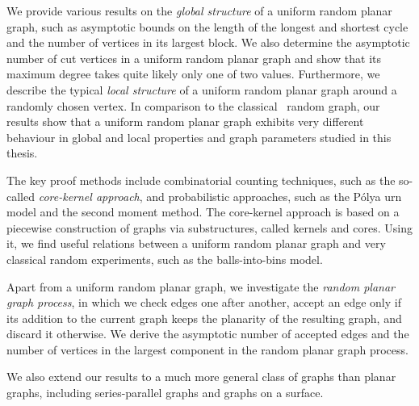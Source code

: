 \documentclass[twoside,openright,bibliography=totoc]{scrreprt}
\theoremstyle{remark}
\theoremstyle{definition}
\theoremstyle{claim}
\begin{document}
We provide various results on the {\em global structure} of a uniform random planar graph, such as asymptotic bounds on the length of the longest and shortest cycle and the number of vertices in its largest block. We also determine the asymptotic number of cut vertices in a uniform random planar graph and show that its maximum degree takes quite likely only one of two values. Furthermore, we describe the typical {\em local structure} of a uniform random planar graph around a randomly chosen vertex. In comparison to the classical \ER\ random graph, our results show that a uniform random planar graph exhibits very different behaviour in global and local properties and graph parameters studied in this thesis.

The key proof methods include combinatorial counting techniques, such as the so-called {\em core-kernel approach}, and probabilistic approaches, such as the P\'olya urn model and the second moment method. The core-kernel approach is based on a piecewise construction of graphs via substructures, called kernels and cores. Using it, we find useful relations between a uniform random planar graph and very classical random experiments, such as the balls-into-bins model.

Apart from a uniform random planar graph, we investigate the {\em random planar graph process}, in which we check edges one after another, accept an edge only if its addition to the current graph keeps the planarity of the resulting graph, and discard it otherwise. We derive the asymptotic number of accepted edges and the number of vertices in the largest component in the random planar graph process.

We also extend our results to a much more general class of graphs than planar graphs, including series-parallel graphs and graphs on a surface.
\end{document}
